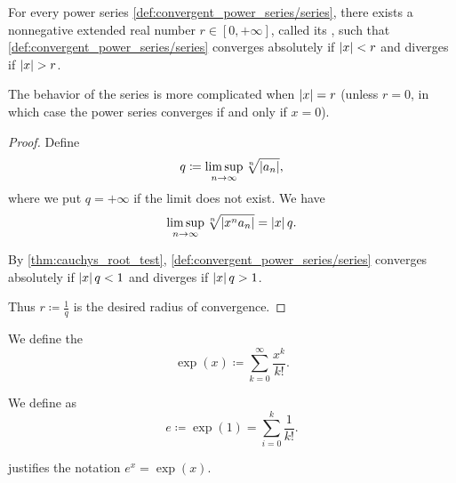 \begin{theorem}\label{thm:power_series_radius_of_convergence}
  For every power series \cref{def:convergent_power_series/series}, there exists a nonnegative extended real number \( r \in [0, +\infty] \), called its , such that \cref{def:convergent_power_series/series} converges absolutely if \( \left\vert x \right\vert < r \) and diverges if \( \left\vert x \right\vert > r \).

  The behavior of the series is more complicated when \( \left\vert x \right\vert = r \) (unless \( r = 0 \), in which case the power series converges if and only if \( x = 0 \)).
\end{theorem}
\begin{proof}
  Define
  \begin{equation*}
    q \coloneqq \limsup_{n \to \infty} \sqrt[n]{\left\vert a_n \right\vert},
  \end{equation*}
  where we put \( q = +\infty \) if the limit does not exist. We have
  \begin{equation*}
    \limsup_{n \to \infty} \sqrt[n]{\left\vert x^n a_n \right\vert} = \left\vert x \right\vert q.
  \end{equation*}

  By \cref{thm:cauchys_root_test}, \cref{def:convergent_power_series/series} converges absolutely if \( \left\vert x \right\vert q < 1 \) and diverges if \( \left\vert x \right\vert q > 1 \).

  Thus \( r \coloneqq \tfrac 1 q \) is the desired radius of convergence.
\end{proof}

\begin{definition}\label{def:exponential_function}
  We define the 
  \begin{equation}\label{def:exponential_function/series}
    \exp(x) \coloneqq \sum_{k=0}^\infty \frac {x^k} {k!}.
  \end{equation}

  We define  as
  \begin{equation*}
    e \coloneqq \exp(1) = \sum_{i=0}^k \frac 1 {k!}.
  \end{equation*}

   justifies the notation \( e^x = \exp(x) \).
\end{definition}

